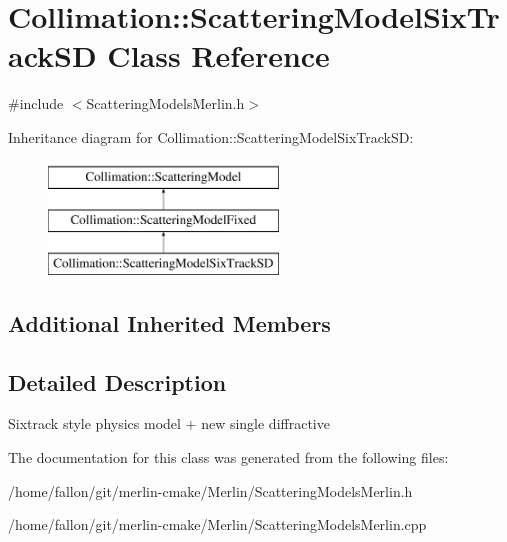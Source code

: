 \hypertarget{classCollimation_1_1ScatteringModelSixTrackSD}{}\section{Collimation\+:\+:Scattering\+Model\+Six\+Track\+SD Class Reference}
\label{classCollimation_1_1ScatteringModelSixTrackSD}


{\ttfamily \#include $<$Scattering\+Models\+Merlin.\+h$>$}

Inheritance diagram for Collimation\+:\+:Scattering\+Model\+Six\+Track\+SD\+:\begin{figure}[H]
\begin{center}
\leavevmode
\includegraphics[height=3.000000cm]{classCollimation_1_1ScatteringModelSixTrackSD}
\end{center}
\end{figure}
\subsection*{Additional Inherited Members}


\subsection{Detailed Description}
Sixtrack style physics model + new single diffractive 

The documentation for this class was generated from the following files\+:\begin{DoxyCompactItemize}
\item 
/home/fallon/git/merlin-\/cmake/\+Merlin/Scattering\+Models\+Merlin.\+h\item 
/home/fallon/git/merlin-\/cmake/\+Merlin/Scattering\+Models\+Merlin.\+cpp\end{DoxyCompactItemize}

